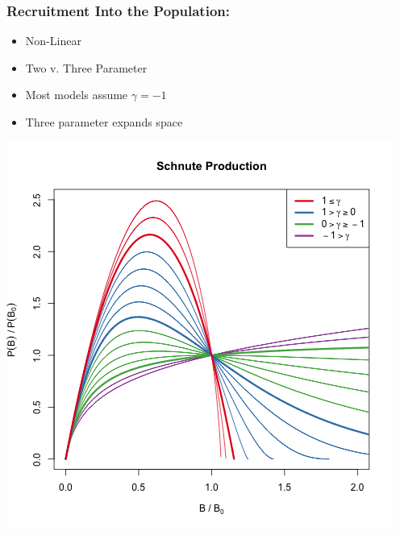\documentclass[a0paper,portrait]{baposter}
\begin{document}
\begin{poster}
{\begin{minipage}[b]{0.5\textwidth}
	\subsubsection*{Recruitment Into the Population:}
        \begin{minipage}[b]{0.5\textwidth}
        \begin{itemize}
		\item Non-Linear
		\item Two v. Three Parameter
		\item Most models assume $\gamma=-1$
		\item Three parameter expands space %
	\end{itemize}
	\end{minipage}
	\begin{minipage}[b]{0.48\textwidth}
		\includegraphics[width=\textwidth]{../../gpBias/g3.png}
	\end{minipage}
	

\end{minipage}}
\end{poster}
\end{document}
